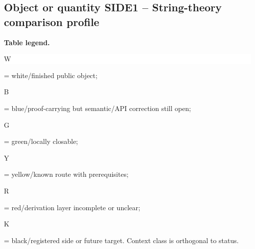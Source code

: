 \subsection*{Object or quantity SIDE1 -- String-theory comparison profile}
\hypertarget{objproof:SIDE1}{}
\par\smallskip\noindent\begin{minipage}{0.99\linewidth}\footnotesize\raggedright\textbf{Table legend.} \colorbox{white}{\strut W} = white/finished public object; \colorbox{cyan!20}{\strut B} = blue/proof-carrying but semantic/API correction still open; \colorbox{green!18}{\strut G} = green/locally closable; \colorbox{yellow!25}{\strut Y} = yellow/known route with prerequisites; \colorbox{red!20}{\strut R} = red/derivation layer incomplete or unclear; \colorbox{black!18}{\strut K} = black/registered side or future target. Context class is orthogonal to status.\end{minipage}\par\vspace{0.25em}
